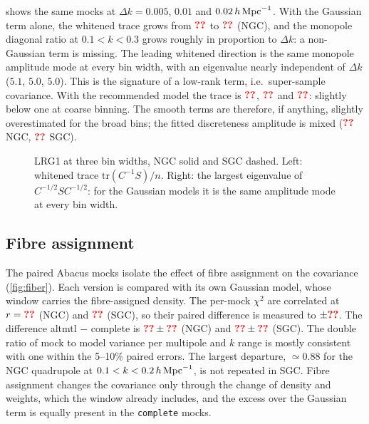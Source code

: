  shows the same mocks at $\Delta k=0.005$, $0.01$ and $0.02\,h\,\mathrm{Mpc}^{-1}$. With the Gaussian term alone, the whitened trace grows from $\val{bintrace/NGC/G/x1}$ to $\val{bintrace/NGC/G/x4}$ (NGC), and the monopole diagonal ratio at $0.1<k<0.3$ grows roughly in proportion to $\Delta k$: a non-Gaussian term is missing. The leading whitened direction is the same monopole amplitude mode at every bin width, with an eigenvalue nearly independent of $\Delta k$ ($5.1$, $5.0$, $5.0$). This is the signature of a low-rank term, i.e.\ super-sample covariance. With the recommended model the trace is $\val{bintrace/NGC/rec/x1}$, $\val{bintrace/NGC/rec/x2}$ and $\val{bintrace/NGC/rec/x4}$: slightly below one at coarse binning. The smooth terms are therefore, if anything, slightly overestimated for the broad bins; the fitted discreteness amplitude is mixed ($\val{tpl/holi_LRG1_NGC/base/disc}$ NGC, $\val{tpl/holi_LRG1_SGC/base/disc}$ SGC).

\begin{figure}
  \centering{}
  \caption{LRG1 at three bin widths, NGC solid and SGC dashed. Left: whitened trace $\mathrm{tr}(C^{-1}S)/n$. Right: the largest eigenvalue of $C^{-1/2}SC^{-1/2}$: for the Gaussian models it is the same amplitude mode at every bin width.}
  \label{fig:binning}
\end{figure}

\subsection{Fibre assignment}
\label{sec:fiber}

The paired Abacus mocks isolate the effect of fibre assignment on the covariance (\cref{fig:fiber}). Each version is compared with its own Gaussian model, whose window carries the fibre-assigned density. The per-mock $\chi^2$ are correlated at $r=\val{fiber/NGC/corr}$ (NGC) and $\val{fiber/SGC/corr}$ (SGC), so their paired difference is measured to $\pm\val{fiber/NGC/differr}$. The difference altmtl $-$ complete is $\val{fiber/NGC/diff}\pm\val{fiber/NGC/differr}$ (NGC) and $\val{fiber/SGC/diff}\pm\val{fiber/SGC/differr}$ (SGC). The double ratio of mock to model variance per multipole and $k$ range is mostly consistent with one within the 5--10\% paired errors. The largest departure, $\simeq0.88$ for the NGC quadrupole at $0.1<k<0.2\,h\,\mathrm{Mpc}^{-1}$, is not repeated in SGC. Fibre assignment changes the covariance only through the change of density and weights, which the window already includes, and the excess over the Gaussian term is equally present in the \texttt{complete} mocks.

